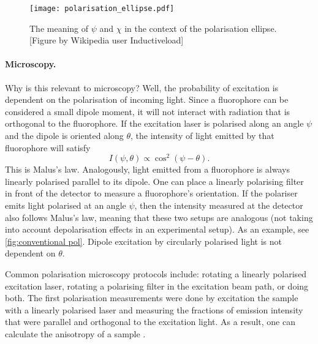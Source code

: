 \begin{figure}
	\centering
	\texttt{[image: polarisation\_ellipse.pdf]}
	\caption{The meaning of $ \psi $ and $ \chi $ in the context of the polarisation ellipse. [Figure by Wikipedia user Inductiveload]}
	\label{fig:pol ellipse}
\end{figure}

\paragraph{Microscopy.} Why is this relevant to microscopy? Well, the probability of excitation is dependent on the polarisation of incoming light. Since a fluorophore can be considered a small dipole moment, it will not interact with radiation that is orthogonal to the fluorophore. If the excitation laser is polarised along an angle $ \psi $ and the dipole is oriented along $ \theta $, the intensity of light emitted by that fluorophore will satisfy 
\begin{equation}
	\label{eq:malus}
	I(\psi, \theta) \propto \cos^2(\psi-\theta).
\end{equation}
This is Malus's law. Analogously, light emitted from a fluorophore is always linearly polarised parallel to its dipole. One can place a linearly polarising filter in front of the detector to measure a fluorophore's orientation. If the polariser emits light polarised at an angle $ \psi $, then the intensity measured at the detector also follows Malus's law, meaning that these two setups are analogous (not taking into account depolarisation effects in an experimental setup). As an example, see \autoref{fig:conventional pol}. Dipole excitation by circularly polarised light is not dependent on $ \theta $. 

Common polarisation microscopy protocols include: rotating a linearly polarised excitation laser, rotating a polarising filter in the excitation beam path, or doing both. The first polarisation measurements were done by excitation the sample with a linearly polarised laser and measuring the fractions of emission intensity that were parallel and orthogonal to the excitation light. As a result, one can calculate the anisotropy of a sample \cite{Camacho2019}.


